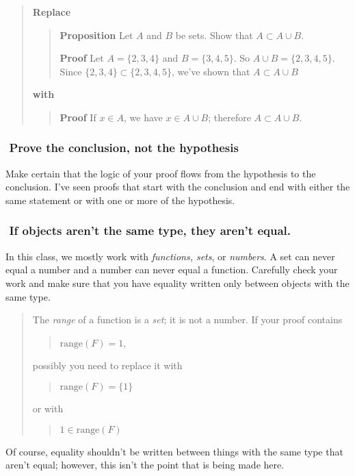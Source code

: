 \documentclass[12pt]{article}
\newcounter{ex}\setcounter{ex}{0}
\newcommand{\ex}{%
\hspace{-0.2in} \setcounter{ex}{\value{ex}+1}
\theex \,\,}
\newcounter{se}\setcounter{se}{0}
\begin{document}
\begin{quote}
\textbf{\textbf{Replace}}
\begin{quote}
 \textbf {Proposition} Let \(A\) and \(B\) be sets.  Show that 
\(A \subset A \cup B\).

\vspace{0.1in}

\textbf{Proof} Let \(A = \{2,3,4\}\) and \(B = \{3,4,5\}\).  So
\mbox{\(A \cup B = \{2,3,4,5\}\)}.  Since \(\{2,3,4\} \subset \{2,3,4,5\}\),
we've shown that \(A \subset A \cup B\)
\end{quote}
\textbf{with}
\begin{quote}
 \textbf {Proof}  If \(x \in A\), we have \(x \in A \cup B\); therefore
\(A \subset A \cup B\).
\end{quote}
\end{quote}

\subsubsection*{\ex Prove the conclusion, not the hypothesis}

Make certain that the logic of your proof flows from the 
hypothesis to the conclusion. I've seen proofs that
start with the conclusion and end with either the same statement
or with one or more of the hypothesis.  



\subsubsection*{\ex If objects aren't the same type, they aren't
  equal.}

In this class, we mostly work with {\em functions, sets}, or {\em
numbers\/}.  A set can never equal a number and a number can never
equal a function.  Carefully check your work and make sure that you
have equality written only between objects with the same type.
\begin{quote}
The {\em range\/} of a function is a {\em set\/}; it is not a
number. If your proof contains
\begin{quote}
 \(\mbox{range}(F) = 1\),
\end{quote}
possibly you need to replace it with
\begin{quote}
 \(\mbox{range}(F) = \{1\}\)
\end{quote}
or with
\begin{quote}
 \(1 \in \mbox{range}(F)\)
\end{quote}
\end{quote}
Of course, equality shouldn't be written between things with the
same type that aren't equal; however, this isn't the point that 
is being made here.
\end{document}
